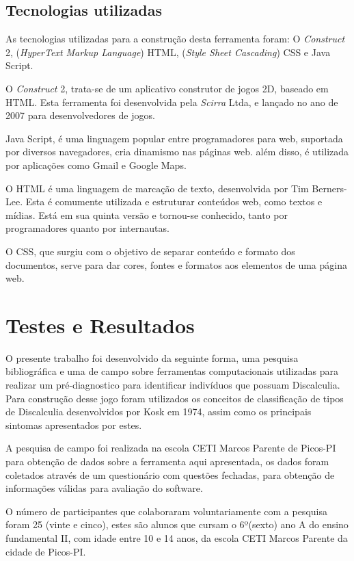 \documentclass[
	12pt,				%
    oneside,			%
	a4paper,			%
	english,			%
	french,				%
	spanish,			%
	brazil,				%
	]{abntex2}
\begin{document}
\section{Tecnologias utilizadas}

As tecnologias utilizadas para a construção desta ferramenta foram: O \textit{Construct} 2, (\textit{HyperText Markup Language}) HTML, (\textit{Style Sheet Cascading}) CSS e Java Script.

O \textit{Construct} 2, trata-se de um aplicativo construtor de jogos 2D, baseado em HTML. Esta ferramenta foi desenvolvida pela \textit{Scirra} Ltda, e lançado no ano de 2007 para desenvolvedores de jogos.

Java Script, é uma linguagem popular entre programadores para web, suportada por diversos navegadores, cria dinamismo nas páginas web. além disso, é utilizada por aplicações como Gmail e Google Maps. 

O HTML é uma linguagem de marcação de texto, desenvolvida por Tim Berners-Lee. Esta é comumente utilizada e estruturar conteúdos web, como textos e mídias. Está em sua quinta versão e tornou-se conhecido, tanto por programadores quanto por internautas.

O CSS, que surgiu com o objetivo de separar conteúdo e formato dos documentos, serve para dar cores, fontes e formatos aos elementos de uma página web. 



\chapter{Testes e Resultados}

O presente trabalho foi desenvolvido da seguinte forma, uma pesquisa bibliográfica e uma de campo sobre ferramentas computacionais utilizadas para realizar um pré-diagnostico para identificar indivíduos que possuam Discalculia. Para construção desse jogo foram utilizados os conceitos de classificação de tipos de Discalculia desenvolvidos por Kosk em 1974, assim como os principais sintomas apresentados por estes.

A pesquisa de campo foi realizada na escola CETI Marcos Parente de Picos-PI para obtenção de dados sobre a ferramenta aqui apresentada, os dados foram coletados através de um questionário com questões fechadas, para obtenção de informações válidas para avaliação do software.

O número de participantes que colaboraram voluntariamente com a pesquisa foram 25 (vinte e cinco), estes são alunos que cursam o 6º(sexto) ano A do ensino fundamental II, com idade entre 10 e 14 anos, da escola CETI Marcos Parente da cidade de Picos-PI.
\end{document}
